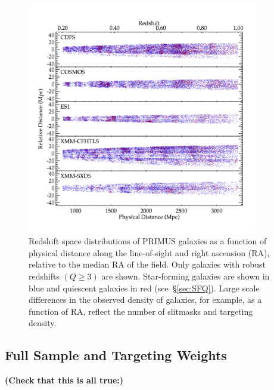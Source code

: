 \begin{figure}
  \centering
  \includegraphics[width=0.9\textwidth,natwidth=600,trim={0.2in 0.5in 0.4in 0.6in},clip]{figures/cone_diagrams.png}
  \caption{Redshift space distributions of PRIMUS galaxies as a function of physical distance along the line-of-sight and right ascension 
(RA), relative to 
the median RA of the field.
Only galaxies with robust redshifts ${(Q \ge 3)}$ are shown.
Star-forming galaxies are shown in blue and quiescent galaxies in red (see~\S\ref{sec:SFQ}). Large scale differences in the observed 
density of galaxies, 
for example, as a function of RA, reflect the number of slitmasks and targeting density.
}
  \label{fig:cone_diagrams}
\end{figure}

\subsection{Full Sample and Targeting Weights}\label{sec:targ_weight}
 
{\bf(Check that this is all true:)}

